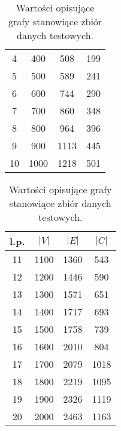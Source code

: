 {\begin{table}
\begin{center}
\begin{tabular}{| c | c | c | c |}
      4 & 400 & 508 & 199 \\
      5 & 500 & 589 & 241 \\
      6 & 600 & 744 & 290 \\
      7 & 700 & 860 & 348 \\
      8 & 800 & 964 & 396 \\
      9 & 900 & 1113 &  445 \\
      10 & 1000 &  1218 &  501 \\ \hline
    \end{tabular} 
    \begin{tabular}{| c | c | c | c |}
      \hline
      l.p. & $|V|$ & $|E|$ & $|C|$ \\ \hline
      11 & 1100 & 1360 &  543 \\
      12 & 1200 & 1446 &  590 \\
      13 & 1300 & 1571 &  651 \\
      14 & 1400 & 1717 &  693 \\
      15 & 1500 & 1758 &  739 \\
      16 & 1600 & 2010 &  804 \\
      17 & 1700 & 2079 & 1018 \\
      18 & 1800 & 2219 & 1095 \\
      19 & 1900 & 2326 & 1119 \\
      20 & 2000 & 2463 & 1163 \\ \hline
    \end{tabular}
    \end{center}
    \caption{Wartości opisujące grafy stanowiące zbiór danych testowych.}
    \label{tab_testdata}
  \end{table}
}
